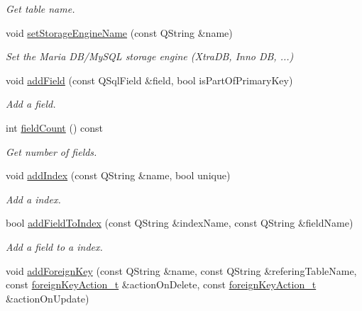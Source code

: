 \begin{DoxyCompactItemize}
\begin{DoxyCompactList}\small\item\em Get table name. \end{DoxyCompactList}\item 
void \hyperlink{classmdt_sql_schema_table_a175f4d150a816bd46bd1a8b3fccbe059}{set\-Storage\-Engine\-Name} (const Q\-String \&name)
\begin{DoxyCompactList}\small\item\em Set the Maria D\-B/\-My\-S\-Q\-L storage engine (Xtra\-D\-B, Inno D\-B, ...) \end{DoxyCompactList}\item 
void \hyperlink{classmdt_sql_schema_table_a199589fde3f06590ba9cd38b1885fa38}{add\-Field} (const Q\-Sql\-Field \&field, bool is\-Part\-Of\-Primary\-Key)
\begin{DoxyCompactList}\small\item\em Add a field. \end{DoxyCompactList}\item 
int \hyperlink{classmdt_sql_schema_table_a24a9e8f260bc96f96219711981124d87}{field\-Count} () const 
\begin{DoxyCompactList}\small\item\em Get number of fields. \end{DoxyCompactList}\item 
void \hyperlink{classmdt_sql_schema_table_a55c4ff0c8d01bf794e84cf4828d2cb56}{add\-Index} (const Q\-String \&name, bool unique)
\begin{DoxyCompactList}\small\item\em Add a index. \end{DoxyCompactList}\item 
bool \hyperlink{classmdt_sql_schema_table_a3deb6f2b10178c252afbaabefb687722}{add\-Field\-To\-Index} (const Q\-String \&index\-Name, const Q\-String \&field\-Name)
\begin{DoxyCompactList}\small\item\em Add a field to a index. \end{DoxyCompactList}\item 
void \hyperlink{classmdt_sql_schema_table_a48ab41fda7864ec8cd59468de2475ff2}{add\-Foreign\-Key} (const Q\-String \&name, const Q\-String \&refering\-Table\-Name, const \hyperlink{classmdt_sql_schema_table_a1738e443f03dc69b914edb967cb911be}{foreign\-Key\-Action\-\_\-t} \&action\-On\-Delete, const \hyperlink{classmdt_sql_schema_table_a1738e443f03dc69b914edb967cb911be}{foreign\-Key\-Action\-\_\-t} \&action\-On\-Update)

\end{DoxyCompactItemize}
